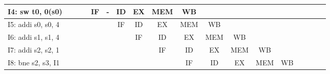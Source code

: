 \documentclass{article}
\begin{document}
\begin{table}[h]
{\begin{tabular}{|l|l|c|c|l|l|c|c|c|c|c|c|l|l|l|l|l|l|}
    I4: sw    t0, 0(s0)                         & \multicolumn{1}{c|}{}   &                       &                       & \multicolumn{1}{c|}{IF}  & \multicolumn{1}{c|}{-}   & ID                    & EX                    & MEM                   & WB                    &                       & \multicolumn{1}{l|}{} &                          &                         &                         &                         &                          &                         \\ \hline
    I5: addi  s0, s0, 4                         &                         & \multicolumn{1}{l|}{} & \multicolumn{1}{l|}{} &                          &                          & IF                    & ID                    & EX                    & MEM                   & WB                    &                       &                          &                         &                         &                         &                          &                         \\ \hline
    I6: addi  s1, s1, 4                         &                         & \multicolumn{1}{l|}{} & \multicolumn{1}{l|}{} &                          &                          & \multicolumn{1}{l|}{} & IF                    & ID                    & EX                    & MEM                   & WB                    & \multicolumn{1}{c|}{}    &                         &                         &                         &                          &                         \\ \hline
    I7: addi  s2, s2, 1                         &                         & \multicolumn{1}{l|}{} & \multicolumn{1}{l|}{} &                          &                          & \multicolumn{1}{l|}{} & \multicolumn{1}{l|}{} & IF                    & ID                    & EX                    & MEM                   & \multicolumn{1}{c|}{WB}  & \multicolumn{1}{c|}{}   &                         &                         &                          &                         \\ \hline
    I8: bne   s2, s3, I1                        & \multicolumn{1}{c|}{}   &                       &                       &                          &                          &                       & \multicolumn{1}{l|}{} & \multicolumn{1}{l|}{} & IF                    & ID                    & EX                    & \multicolumn{1}{c|}{MEM} & \multicolumn{1}{c|}{WB} & \multicolumn{1}{c|}{}   & \multicolumn{1}{c|}{}   &                          & \multicolumn{1}{c|}{}   \\ \hline

\end{tabular}}
\end{table}
\end{document}
